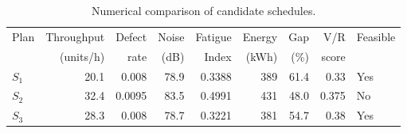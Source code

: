 \begin{table}[htbp]
\centering
\caption{Numerical comparison of candidate schedules.}
\label{tab:numerical-sim}
\small
\begin{tabular}{@{}lrrrrrrrl@{}}
\toprule
Plan & Throughput & Defect & Noise & Fatigue & Energy & Gap & V/R & Feasible \\
     & (units/h)  & rate   & (dB)  & Index   & (kWh)  & (\%) & score &         \\
\midrule
$S_{1}$ & 20.1 & 0.008 & 78.9 & 0.3388 & 389 & 61.4 & 0.33 & Yes \\
$S_{2}$ & 32.4 & 0.0095 & 83.5 & 0.4991 & 431 & 48.0 & 0.375 & No \\
$S_{3}$ & 28.3 & 0.008 & 78.7 & 0.3221 & 381 & 54.7 & 0.38 & Yes \\
\bottomrule
\end{tabular}
\end{table}
